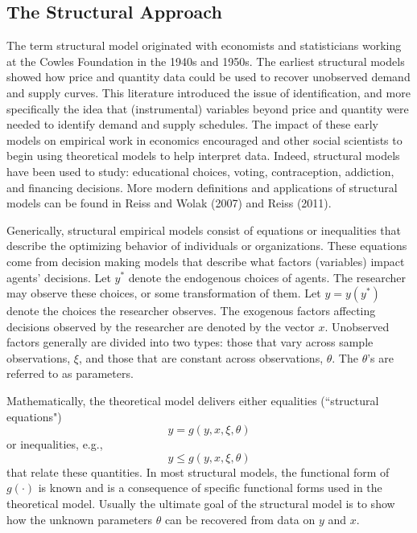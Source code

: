 \subsection{The Structural Approach}

The term structural model originated with economists and statisticians working at
the Cowles Foundation in the 1940s and 1950s.
The earliest structural models showed how price and quantity data could be used to recover unobserved demand and supply curves. 
This literature
introduced the issue of identification, and more specifically the idea that (instrumental) variables beyond price and quantity were needed to identify demand and supply schedules. 
The impact of these early models on empirical work in economics encouraged and other social scientists to begin using theoretical models to help interpret 
data.
Indeed, structural models have been used to study: educational choices, voting, 
contraception, addiction, and financing decisions. 
More modern definitions and applications 
of structural models can be found in Reiss and Wolak (2007) and Reiss (2011). 

Generically, structural empirical models consist of equations or inequalities that describe the optimizing behavior of individuals or organizations. These equations come from decision making models that describe what factors (variables) impact agents' decisions.
Let $y^*$ denote the endogenous choices of agents. 
The researcher may observe these choices, or some transformation of them.
Let $y=y(y^*)$ denote the choices the researcher observes. 
The exogenous factors affecting decisions observed by the researcher are denoted by the vector $x$. 
Unobserved factors generally
are divided into two types: those that vary across sample observations, $\xi$, and
those that are constant across observations, $\theta$. 
The $\theta$'s are referred to as parameters.

Mathematically, the theoretical model delivers either equalities (``structural equations")
$$  y = g(y, x,\xi ,\theta)$$ 
or inequalities, e.g.,
$$  y \le g(y, x,\xi ,\theta)$$
that relate these quantities. In most structural models, the functional form of $g(\cdot)$ is known
and is a consequence of specific functional forms used in the theoretical model. 
Usually the ultimate goal of the structural model is to show how the unknown parameters 
$\theta$ can be recovered from data on $y$ and $x$. 

